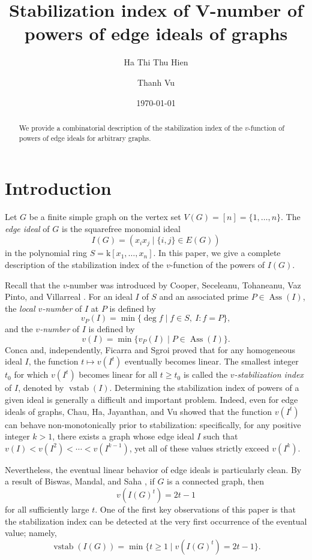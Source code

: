 \documentclass[12pt,reqno,twoside]{amsart}
\title{Stabilization index of V-number of powers of edge ideals of graphs}
\author{Ha Thi Thu Hien}
\author{Thanh Vu}
\date{\today}
\theoremstyle{definition}
\theoremstyle{plain}
\theoremstyle{remark}
\numberwithin{equation}{section}
\begin{document}
\begin{abstract} We provide a combinatorial description of the stabilization index of the $v$-function of powers of edge ideals for arbitrary graphs.
\end{abstract}

\maketitle

\section{Introduction} 
Let $G$ be a finite simple graph on the vertex set $V(G) = [n] = \{1, \ldots, n\}$. The \emph{edge ideal} of $G$ is the squarefree monomial ideal
\[
I(G) = (x_i x_j \mid \{i, j\} \in E(G))
\]
in the polynomial ring $S = \mathrm{k}[x_1, \ldots, x_n]$. In this paper, we give a complete description of the stabilization index of the $v$-function of the powers of $I(G)$.

Recall that the $v$-number was introduced by Cooper, Seceleanu, Tohaneanu, Vaz Pinto, and Villarreal \cite{CSTVV}. For an ideal $I$ of $S$ and an associated prime $P \in \operatorname{Ass}(I)$, the \emph{local $v$-number} of $I$ at $P$ is defined by
\[
v_P(I) = \min\{\deg f \mid f \in S, \ I:f = P\},
\]
and the \emph{$v$-number} of $I$ is defined by
\[
v(I) = \min\{v_P(I) \mid P \in \operatorname{Ass}(I)\}.
\]
Conca \cite{C} and, independently, Ficarra and Sgroi \cite{FS} proved that for any homogeneous ideal $I$, the function $t \mapsto v(I^t)$ eventually becomes linear. The smallest integer $t_0$ for which $v(I^t)$ becomes linear for all $t \ge t_0$ is called the \emph{$v$-stabilization index} of $I$, denoted by $\operatorname{vstab}(I)$. Determining the stabilization index of powers of a given ideal is generally a difficult and important problem. Indeed, even for edge ideals of graphs, Chau, Ha, Jayanthan, and Vu \cite{CHJV} showed that the function $v(I^t)$ can behave non-monotonically prior to stabilization: specifically, for any positive integer $k>1$, there exists a graph whose edge ideal $I$ such that $v(I) < v(I^2) < \cdots < v(I^{k-1})$, yet all of these values strictly exceed $v(I^k)$. 

Nevertheless, the eventual linear behavior of edge ideals is particularly clean. By a result of Biswas, Mandal, and Saha \cite{BMS}, if $G$ is a connected graph, then
\[
v(I(G)^t) = 2t - 1
\]
for all sufficiently large $t$. One of the first key observations of this paper is that the stabilization index can be detected at the very first occurrence of the eventual value; namely,
\[
\operatorname{vstab}(I(G)) = \min\{t \ge 1 \mid v(I(G)^t) = 2t - 1\}.
\]
\end{document}
